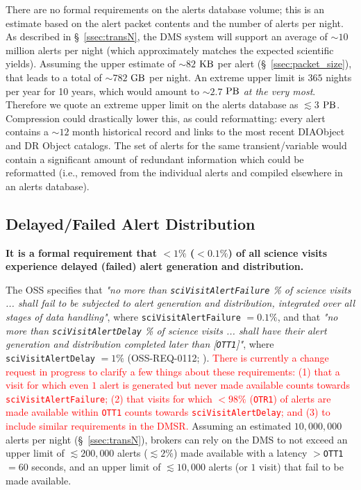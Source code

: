 \documentclass[DM,authoryear,toc]{lsstdoc}
\begin{document}
There are no formal requirements on the alerts database volume; this is an estimate based on the alert packet contents and the number of alerts per night. As described in \S~\ref{ssec:transN}, the DMS system will support an average of $\sim10$ million alerts per night (which approximately matches the expected scientific yields). Assuming the upper estimate of $\sim82$ $\rm KB$ per alert (\S~\ref{ssec:packet_size}), that leads to a total of $\sim782$ $\rm GB$ per night. An extreme upper limit is $365$ nights per year for 10 years, which would amount to $\sim2.7$ $\rm PB$ {\it at the very most}. Therefore we quote an extreme upper limit on the alerts database as $\lesssim3$ $\rm PB$. Compression could drastically lower this, as could reformatting: every alert contains a $\sim12$ month historical record and links to the most recent DIAObject and DR Object catalogs. The set of alerts for the same transient/variable would contain a significant amount of redundant information which could be reformatted (i.e., removed from the individual alerts and compiled elsewhere in an alerts database). 


\subsection{Delayed/Failed Alert Distribution}\label{ssec:OTR1}

{\bf It is a formal requirement that $<1\%$ ($<0.1\%$) of all science visits experience delayed (failed) alert generation and distribution.}

The OSS specifies that {\it "no more than {\tt sciVisitAlertFailure} \% of science visits ... shall fail to be subjected to alert generation and distribution, integrated over all stages of data handling"}, where {\tt sciVisitAlertFailure} $=0.1\%$, and that {\it "no more than {\tt sciVisitAlertDelay} \% of science visits ... shall have their alert generation and distribution completed later than [{\tt OTT1}]"}, where {\tt sciVisitAlertDelay} $=1\%$ (OSS-REQ-0112; ). \textcolor{red}{There is currently a change request in progress to clarify a few things about these requirements: (1) that a visit for which even $1$ alert is generated but never made available counts towards {\tt sciVisitAlertFailure}; (2) that visits for which $<98\%$ ({\tt OTR1}) of alerts are made available within {\tt OTT1} counts towards {\tt sciVisitAlertDelay}; and (3) to include similar requirements in the DMSR.} Assuming an estimated $10,000,000$ alerts per night (\S~\ref{ssec:transN}), brokers can rely on the DMS to not exceed an upper limit of $\lesssim 200,000$ alerts ($\lesssim 2\%$) made available with a latency $>${\tt OTT1}$=60$ seconds, and an upper limit of $\lesssim 10,000$ alerts (or $1$ visit) that fail to be made available.
\end{document}

